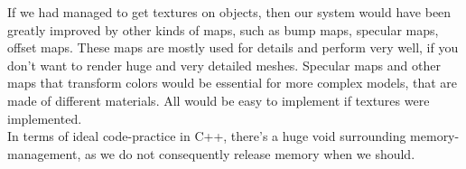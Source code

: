 If we had managed to get textures on objects, then our system would have been greatly improved by other kinds of maps, such as bump maps, specular maps, offset maps. These maps are mostly used for details and perform very well, if you don’t want to render huge and very detailed meshes. Specular maps and other maps that transform colors would be essential for more complex models, that are made of different materials. All would be easy to implement if textures were implemented. \\

In terms of ideal code-practice in C++, there’s a huge void surrounding memory-management, as we do not consequently release memory when we should.\\
